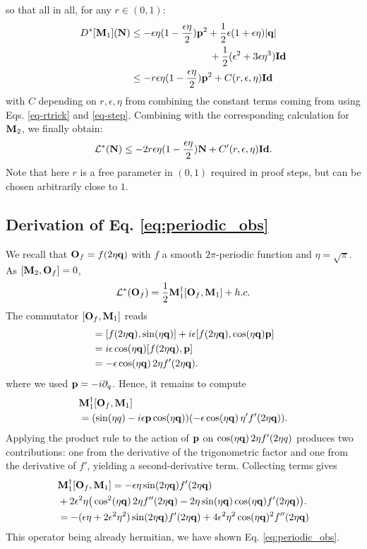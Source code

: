 \documentclass[a4paper, 11pt]{article}
\newcommand{\oN}{{\bf N}}
\newcommand{\oM}{{\bf M}}
\newcommand{\oO}{{\bf O}}
\newcommand{\oq}{{\bf q}}
\newcommand{\op}{{\bf p}}
\newcommand{\oid}{{\bf Id}}
\begin{document}
so that all in all, for any $r\in (0,1)$:
\begin{align}
    D^*[\oM_1](\oN) &\leq
    -\epsilon\eta (1-\frac{\epsilon\eta}{2})\op^2 
    + \frac12\epsilon(1+\epsilon\eta)|\oq| \\
    &\qquad \qquad \qquad \qquad +\frac12(\epsilon^2 
    + 3\epsilon\eta^3)\oid \label{eq-step}\\
    &\leq -r \epsilon\eta (1-\frac{\epsilon\eta}{2})\op^2 + C(r,\epsilon,\eta)\oid
\end{align}
with $C$ depending on $r,\epsilon,\eta$ from combining the constant terms coming from using Eqs. \eqref{eq-rtrick} and \eqref{eq-step}.
Combining with the corresponding calculation for $\oM_2$, we finally obtain:
\begin{equation}
    \mathcal L^*(\oN) \leq -2 r \epsilon\eta (1-\frac{\epsilon\eta}{2})\oN + C'(r,\epsilon,\eta) \oid.
\end{equation}
Note that here $r$ is a free parameter in $(0,1)$ required in proof steps, but can be chosen arbitrarily close to $1$.



\subsection{Derivation of Eq. \eqref{eq:periodic_obs}}
We recall that $\oO_f = f(2\eta \oq)$ with $f$ a smooth $2\pi$-periodic function and $\eta=\sqrt{\pi}$. As $[\oM_2, \oO_f]=0$, 
$$\mathcal{L}^*(\oO_f)=\frac{1}{2} \oM_1^\dagger [\oO_f,\oM_1] + h.c.$$
The commutator $[\oO_f,\oM_1]$ reads
\begin{align}
[\oO_f,\oM_1] &= [f(2 \eta \oq),\sin(\eta \oq)] + i\epsilon [f(2\eta \oq),\cos(\eta \oq) \op] \nonumber\\
&=i\epsilon \cos(\eta \oq)  [f(2\eta \oq),\op] \nonumber\\
&=-\epsilon\cos(\eta \oq)\,2\eta f'(2\eta \oq).
\end{align}
where we used $\op=-i\partial_q$. Hence, it remains to compute
\begin{align*}
&\oM_1^\dagger[\oO_f,\oM_1] \\
&= (\sin(\eta q)-i\epsilon \op\cos(\eta \oq))(-\epsilon\cos(\eta \oq)\,\eta' f'(2\eta \oq)).
\end{align*}
Applying the product rule to the action of $\op$ on $\cos(\eta \oq)\,2\eta f'(2\eta q)$ produces two contributions: one from the derivative of the trigonometric factor and one from the derivative of $f'$, yielding a second-derivative term. Collecting terms gives
\begin{align*}
&\oM_1^\dagger[\oO_f,\oM_1]=
-\epsilon\eta\sin(2\eta  \oq) f'(2\eta \oq) \\
&+ 2\epsilon^2\eta\big(\cos^2(\eta \oq)\,2\eta f''(2\eta \oq)-2\eta\sin(\eta \oq)\cos(\eta \oq) f'(2\eta \oq)\big).\\
&= -(\epsilon \eta +2\epsilon^2 \eta^2) \sin(2 \eta \oq) f'(2\eta \oq) + 4 \epsilon^2 \eta^2 \cos( \eta \oq)^2 f''(2\eta \oq)
\end{align*}
This operator being already hermitian, we have shown Eq. \eqref{eq:periodic_obs}.
\end{document}
